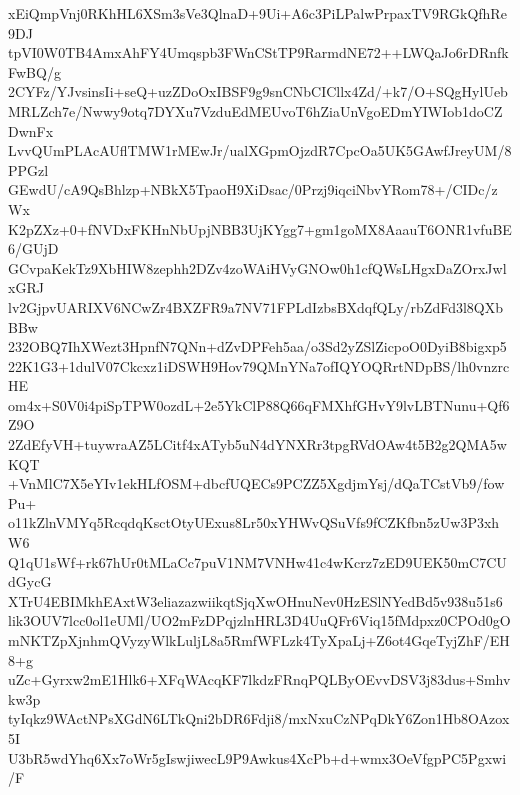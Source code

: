 xEiQmpVnj0RKhHL6XSm3sVe3QlnaD+9Ui+A6c3PiLPalwPrpaxTV9RGkQfhRe9DJ
tpVI0W0TB4AmxAhFY4Umqspb3FWnCStTP9RarmdNE72++LWQaJo6rDRnfkFwBQ/g
2CYFz/YJvsinsIi+seQ+uzZDoOxIBSF9g9snCNbCICllx4Zd/+k7/O+SQgHylUeb
MRLZch7e/Nwwy9otq7DYXu7VzduEdMEUvoT6hZiaUnVgoEDmYIWIob1doCZDwnFx
LvvQUmPLAcAUflTMW1rMEwJr/ualXGpmOjzdR7CpcOa5UK5GAwfJreyUM/8PPGzl
GEwdU/cA9QsBhlzp+NBkX5TpaoH9XiDsac/0Przj9iqciNbvYRom78+/CIDc/zWx
K2pZXz+0+fNVDxFKHnNbUpjNBB3UjKYgg7+gm1goMX8AaauT6ONR1vfuBE6/GUjD
GCvpaKekTz9XbHIW8zephh2DZv4zoWAiHVyGNOw0h1cfQWsLHgxDaZOrxJwlxGRJ
lv2GjpvUARIXV6NCwZr4BXZFR9a7NV71FPLdIzbsBXdqfQLy/rbZdFd3l8QXbBBw
232OBQ7IhXWezt3HpnfN7QNn+dZvDPFeh5aa/o3Sd2yZSlZicpoO0DyiB8bigxp5
22K1G3+1dulV07Ckcxz1iDSWH9Hov79QMnYNa7ofIQYOQRrtNDpBS/lh0vnzrcHE
om4x+S0V0i4piSpTPW0ozdL+2e5YkClP88Q66qFMXhfGHvY9lvLBTNunu+Qf6Z9O
2ZdEfyVH+tuywraAZ5LCitf4xATyb5uN4dYNXRr3tpgRVdOAw4t5B2g2QMA5wKQT
+VnMlC7X5eYIv1ekHLfOSM+dbcfUQECs9PCZZ5XgdjmYsj/dQaTCstVb9/fowPu+
o11kZlnVMYq5RcqdqKsctOtyUExus8Lr50xYHWvQSuVfs9fCZKfbn5zUw3P3xhW6
Q1qU1sWf+rk67hUr0tMLaCc7puV1NM7VNHw41c4wKcrz7zED9UEK50mC7CUdGycG
XTrU4EBIMkhEAxtW3eliazazwiikqtSjqXwOHnuNev0HzESlNYedBd5v938u51s6
lik3OUV7lcc0ol1eUMl/UO2mFzDPqjzlnHRL3D4UuQFr6Viq15fMdpxz0CPOd0gO
mNKTZpXjnhmQVyzyWlkLuljL8a5RmfWFLzk4TyXpaLj+Z6ot4GqeTyjZhF/EH8+g
uZc+Gyrxw2mE1Hlk6+XFqWAcqKF7lkdzFRnqPQLByOEvvDSV3j83dus+Smhvkw3p
tyIqkz9WActNPsXGdN6LTkQni2bDR6Fdji8/mxNxuCzNPqDkY6Zon1Hb8OAzox5I
U3bR5wdYhq6Xx7oWr5gIswjiwecL9P9Awkus4XcPb+d+wmx3OeVfgpPC5Pgxwi/F
